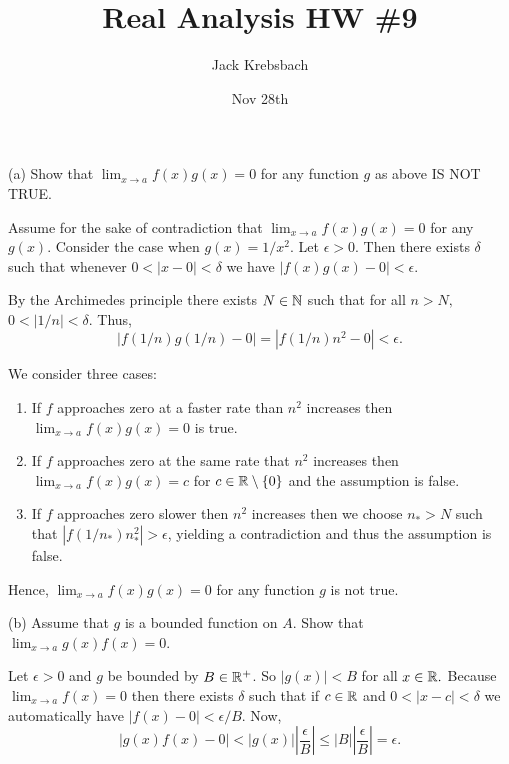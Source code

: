 \documentclass{report}
\title{Real Analysis HW \#9}
\author{Jack Krebsbach }
\date{Nov 28th}
\begin{document}
\maketitle


(a) Show that $\lim _{x \rightarrow a} f(x) g(x)=0$ for any function $g$ as above IS NOT TRUE.

\begin{myproof}
     Assume for the sake of contradiction that $\lim _{x \rightarrow a} f(x) g(x)=0$ for  any $g(x).$ Consider the case when $g(x)= 1/x^2.$ Let $\epsilon >0.$ Then there exists $\delta$ such that whenever $0 < |x - 0| < \delta$ we have $|f(x)g(x) -0|<\epsilon.$

  By the Archimedes principle there exists $N \in \NN$ such that for all $n > N,$ $0 < |1/n| < \delta.$ Thus, $$ |f(1/n)g(1/n)-0|=|f(1/n)n^2 -0|<\epsilon.$$

  We consider three cases:

  \begin{enumerate}
    \item If $f$ approaches zero at a faster rate than $n^2$ increases then $\lim _{x \rightarrow a} f(x) g(x)=0$ is true.
    \item If $f$ approaches zero at the same rate that $n^2$ increases then $\lim _{x \rightarrow a} f(x) g(x)=c$ for $c \in \RR \setminus \{0\}$ and the assumption is false.
    \item   If $f$ approaches zero slower then $n^2$ increases then we  choose $n_* > N$ such that $ |f(1/n_*)n_*^2| > \epsilon$, yielding a contradiction and thus the assumption is false.
   \end{enumerate}
Hence, $\lim _{x \rightarrow a} f(x) g(x)=0$ for any function $g$ is not true.
\end{myproof}

\bigskip
\bigskip
\bigskip

(b) Assume that $g$ is a bounded function on $A$. Show that $\lim _{x \rightarrow a} g(x) f(x)=0$.

\begin{myproof}
    Let $\epsilon >0$ and $g$ be bounded by $B \in \RR^+$. So $|g(x)| < B$ for all $x \in \RR.$ Because $\lim _{x \rightarrow a} f(x)=0$ then there exists $\delta$ such that if $c\in \RR$ and $0 < | x -c | <\delta$ we automatically have $|f(x) - 0| <  \epsilon / B$.
Now, $$ |g(x)f(x) - 0| < |g(x)|\left|\frac{\epsilon}{B}\right| \leq |B|\left|\frac{\epsilon}{B}\right| = \epsilon.  $$

\end{myproof}
\end{document}

